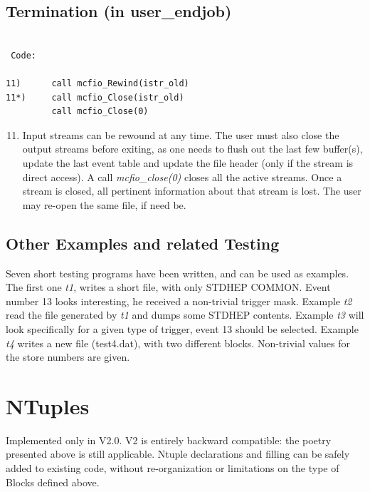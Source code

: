 \subsection{Termination (in user\_endjob)}
\vspace{.1in}
\begin{verbatim}

 Code:

11)      call mcfio_Rewind(istr_old)
11*)     call mcfio_Close(istr_old)
         call mcfio_Close(0)

\end{verbatim}
\vspace{.1in}
\begin{enumerate}
\setcounter{enumi}{10}
\item Input streams  can be rewound at any time.  The user must also
 close the output streams before exiting, as
one needs to flush out the last few buffer(s), update the last event
table and update the file header (only if the stream is direct access).
A call {\em mcfio\_close(0)}  closes all the active streams. Once
a stream is closed, all pertinent information about that stream is lost.
The user may  re-open the same file, if need be.
\end{enumerate}


\subsection{Other Examples and  related Testing}

Seven short testing programs have been written, and can be used as  examples.
The first one {\em t1}, writes a short file, with only STDHEP COMMON. Event
number 13 looks interesting, he received a non-trivial  trigger mask. Example
{\em t2} read the file generated by {\em t1} and dumps  some STDHEP contents.
Example {\em t3} will look specifically for a  given type of trigger, event 13
should be selected. Example {\em t4}  writes a new file (test4.dat), with two
different blocks. Non-trivial values for the  store numbers are given.

\section{NTuples}

	Implemented only in V2.0.  V2 is entirely backward compatible:
the poetry presented above is still applicable.  Ntuple declarations and filling
can be safely added to existing code, without re-organization or limitations
on the type of Blocks defined above.

